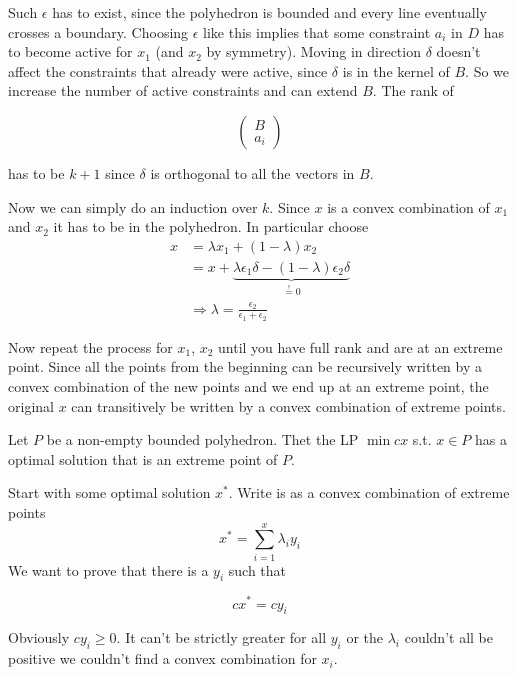 \begin{pr}
Such $\epsilon$ has to exist, since the polyhedron is bounded and every line eventually crosses a boundary. Choosing $\epsilon$ like this implies that some constraint $a_i$ in $D$ has to become active for $x_1$ (and $x_2$ by symmetry). Moving in direction $\delta$ doesn't affect the constraints that already were active, since $\delta$ is in the kernel of $B$. So we increase the number of active constraints and can extend $B$. The rank of

\[\begin{pmatrix}B\\ a_i\end{pmatrix}\]

has to be $k+1$ since $\delta$ is orthogonal to all the vectors in $B$. %

Now we can simply do an induction over $k$. Since $x$ is a convex combination of $x_1$ and $x_2$ it has to be in the polyhedron. In particular choose
\begin{align*}
x&=\lambda x_1+(1-\lambda)x_2\\
&=x+\underbrace{\lambda \epsilon_1\delta -(1-\lambda)\epsilon_2\delta}_{\stackrel{!}{=}0}\\
&\Rightarrow \lambda = \frac{\epsilon_2}{\epsilon_1+\epsilon_2}
\end{align*}

Now repeat the process for $x_1$, $x_2$ until you have full rank and are at an extreme point. Since all the points from the beginning can be recursively written by a convex combination of the new points and we end up at an extreme point, the original $x$ can transitively be written by a convex combination of extreme points.
\end{pr}

\begin{cor}\label{Cor:always_extreme_points} Let $P$ be a non-empty bounded polyhedron. Thet the LP $\min cx$ s.t. $x\in P$ has a optimal solution that is an extreme point of $P$.
\end{cor}

\begin{pr} Start with some optimal solution $x^*$. Write is as a convex combination of extreme points 
\[x^* = \sum_{i=1}^x \lambda_i y_i\]
We want to prove that there is a $y_i$ such that

\[cx^* = cy_i\]

Obviously $cy_i\geq 0$. It can't be strictly greater for all $y_i$ or the $\lambda_i$ couldn't all be positive we couldn't find a convex combination for $x_i$. 
\end{pr}

